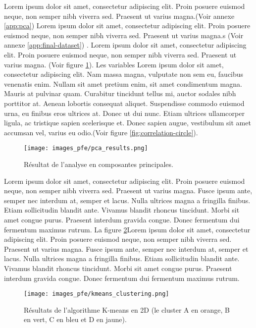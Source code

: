 Lorem ipsum dolor sit amet, consectetur adipiscing elit. Proin posuere euismod neque, non semper nibh viverra sed. Praesent ut varius magna.(Voir annexe \ref{app:pca}) Lorem ipsum dolor sit amet, consectetur adipiscing elit. Proin posuere euismod neque, non semper nibh viverra sed. Praesent ut varius magna.s (Voir annexe \ref{app:final-dataset}) . Lorem ipsum dolor sit amet, consectetur adipiscing elit. Proin posuere euismod neque, non semper nibh viverra sed. Praesent ut varius magna. (Voir figure \ref{fig:pca-method}). Les variables Lorem ipsum dolor sit amet, consectetur adipiscing elit. Nam massa magna, vulputate non sem eu, faucibus venenatis enim. Nullam sit amet pretium enim, sit amet condimentum magna. Mauris at pulvinar quam. Curabitur tincidunt tellus mi, auctor sodales nibh porttitor at. Aenean lobortis consequat aliquet. Suspendisse commodo euismod urna, eu finibus eros ultrices at. Donec ut dui nunc. Etiam ultrices ullamcorper ligula, ac tristique sapien scelerisque et. Donec sapien augue, vestibulum sit amet accumsan vel, varius eu odio.(Voir figure \ref{fig:correlation-circle}).


\begin{figure}[hbt!]
  \centering
  \texttt{[image: images\_pfe/pca\_results.png]}
  \caption{Résultat de l'analyse en composantes principales.}
  \label{fig:pca-method}
\end{figure}
\FloatBarrier


Lorem ipsum dolor sit amet, consectetur adipiscing elit. Proin posuere euismod neque, non semper nibh viverra sed. Praesent ut varius magna. Fusce ipsum ante, semper nec interdum at, semper et lacus. Nulla ultrices magna a fringilla finibus. Etiam sollicitudin blandit ante. Vivamus blandit rhoncus tincidunt. Morbi sit amet congue purus. Praesent interdum gravida congue. Donec fermentum dui fermentum maximus rutrum. La figure \ref{fig:kmeans-pca}Lorem ipsum dolor sit amet, consectetur adipiscing elit. Proin posuere euismod neque, non semper nibh viverra sed. Praesent ut varius magna. Fusce ipsum ante, semper nec interdum at, semper et lacus. Nulla ultrices magna a fringilla finibus. Etiam sollicitudin blandit ante. Vivamus blandit rhoncus tincidunt. Morbi sit amet congue purus. Praesent interdum gravida congue. Donec fermentum dui fermentum maximus rutrum.

\begin{figure}[hbt!]
  \centering
  \texttt{[image: images\_pfe/kmeans\_clustering.png]}
  \caption{Résultats de l'algorithme K-means en 2D (le cluster A en orange, B en vert, C en bleu et D en jaune).}
  \label{fig:kmeans-pca}
\end{figure}
\FloatBarrier

